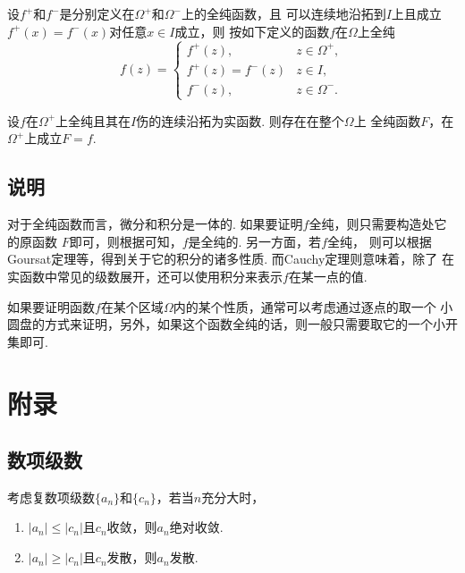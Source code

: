   \begin{thm}
    设$f^+$和$f^-$是分别定义在$\Omega^+$和$\Omega^-$上的全纯函数，且
    可以连续地沿拓到$I$上且成立$f^+(x)=f^-(x)$对任意$x\in I$成立，则
    按如下定义的函数$f$在$\Omega$上全纯
    \[
      f(z)=
      \begin{cases}
        f^+(z), &z\in\Omega^+, \\
        f^+(z)=f^-(z) &z\in I, \\
        f^-(z), & z\in\Omega^-.
      \end{cases}
    \]
  \end{thm}

  \begin{thm}[Schwarz镜像原理]
    设$f$在$\Omega^+$上全纯且其在$I$伤的连续沿拓为实函数. 则存在在整个$\Omega$上
    全纯函数$F$，在$\Omega^+$上成立$F=f$.
  \end{thm}

\subsection{说明}
  对于全纯函数而言，微分和积分是一体的. 如果要证明$f$全纯，则只需要构造处它的原函数
  $F$即可，则根据可知，$f$是全纯的. 另一方面，若$f$全纯，
  则可以根据Goursat定理等，得到关于它的积分的诸多性质. 而Cauchy定理则意味着，除了
  在实函数中常见的级数展开，还可以使用积分来表示$f$在某一点的值. \par
  如果要证明函数$f$在某个区域$\Omega$内的某个性质，通常可以考虑通过逐点的取一个
  小圆盘的方式来证明，另外，如果这个函数全纯的话，则一般只需要取它的一个小开集即可.



\newpage
\section{附录}

\subsection{数项级数}

  \begin{thm}
    考虑复数项级数$\{a_n\}$和$\{c_n\}$，若当$n$充分大时，
    \begin{enumerate}
      \item $|a_n| \le |c_n|$且$c_n$收敛，则$a_n$绝对收敛.
      \item $|a_n| \ge |c_n|$且$c_n$发散，则$a_n$发散.
    \end{enumerate}
  \end{thm}

